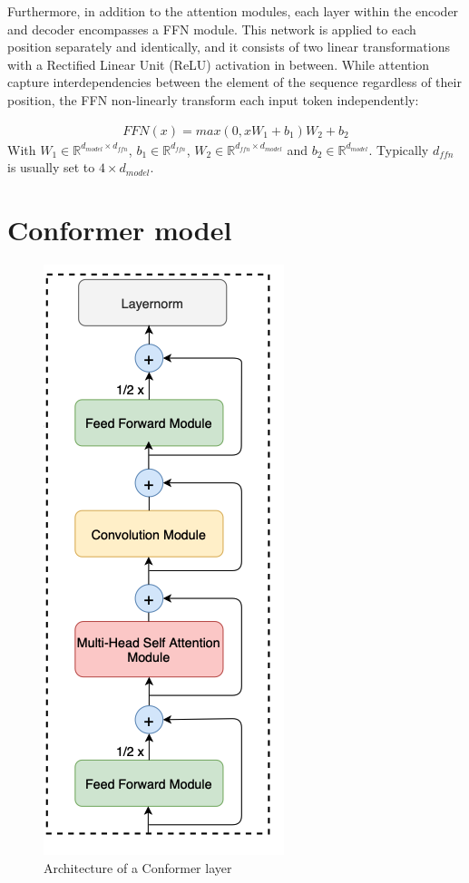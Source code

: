 Furthermore, in addition to the attention modules, each layer within the encoder and decoder encompasses a FFN module. This network is applied to each position separately and identically, and it consists of two linear transformations with a Rectified Linear Unit (ReLU) activation in between. While attention capture interdependencies between the element of the sequence regardless of their position, the FFN non-linearly transform each input token independently:

\begin{align}
    FFN(x) = max(0,xW_1 + b_1)W_2 + b_2
    \label{equation:FFN}
\end{align}
With $W_1 \in \mathbb{R}^{d_{model} \times d_{ffn}}$, $b_1 \in \mathbb{R}^{d_{ffn}}$, $W_2 \in \mathbb{R}^{d_{ffn} \times d_{model}}$ and $b_2 \in \mathbb{R}^{d_{model}}$. Typically $d_{ffn}$ is usually set to $4 \times d_{model}$.

\section{Conformer model}
\label{sec:conformer}
\begin{figure}[h]
    \centering
    \includegraphics[scale=0.4]{imgs/ConformerLayer.png}
    \caption{Architecture of a Conformer layer}
    \label{fig:conformer_archi}
\end{figure}

